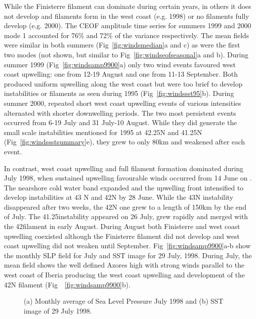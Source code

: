 While the Finisterre filament can dominate during certain years,
in others it does not develop and filaments form in the west coast
(e.g. 1998) or no filaments fully develop (e.g. 2000). The CEOF
amplitude time series for summers 1999 and 2000 mode 1 accounted
for 76\% and 72\% of the variance respectively. The mean fields
were similar in both summers (Fig~\ref{fig:windsmedian}a and c) as
were the first two modes (not shown, but similar to
Fig~\ref{fig:windseofseasonal}a and b). During summer 1999
({Fig~\ref{fig:windsamp9900}}a) only two wind events favoured west
coast upwelling: one from 12-19 August and one from 11-13
September. Both produced uniform upwelling along the west coast
but were too brief to develop instabilities or filaments as seen
during 1995 (Fig~\ref{fig:windssst95}b). During summer 2000,
repeated short west coast upwelling events of various intensities
alternated with shorter downwelling periods. The two most
persistent events occurred from 6-19 July and 31 July-10 August.
While they did generate the small scale instabilities mentioned
for 1995 at 42.25\deg N and 41.25\deg N
(Fig~\ref{fig:windssstsummary}e), they grew to only 80km and
weakened after each event.

In contrast, west coast upwelling and full filament formation
dominated during July 1998, when sustained upwelling favourable
winds occurred from 14 June on \nocite{Smyth01}. The nearshore cold water band expanded and
the upwelling front intensified to develop instabilities at 43\deg
N and 42\deg N by 28 June. While the 43\deg N instability
disappeared after two weeks, the 42\deg N one grew to a length of
150km by the end of July. The 41.25\deg instability appeared on 26
July, grew rapidly and merged with the 42\deg filament in early
August. During August both Finisterre and west coast upwelling
coexisted although the Finisterre filament did not develop and
west coast upwelling did not weaken until September.
{Fig~\ref{fig:windsamp9900}}a-b show the monthly SLP field for
July and SST image for 29 July, 1998. During July, the mean field
shows the well defined Azores high with strong winds parallel to
the west coast of Iberia producing the west coast upwelling and
development of the 42\deg N filament
(Fig~~\ref{fig:windsamp9900}b).
\begin{figure}[t]
  \caption{(a)
Monthly average of Sea Level Pressure July 1998 and (b) SST image
of 29 July 1998.}\label{fig:windsslp98}
\end{figure}

